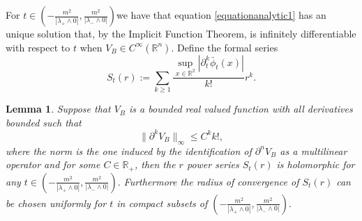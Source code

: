 \documentclass[a4paper,10pt]{article}
\newcommand{\assign}{:=}
\newtheorem{lemma}[theorem]{Lemma}
\begin{document}
For $t \in \left( - \frac{m^2}{| \lambda_+ \wedge 0 |}, \frac{m^2}{|
\lambda_- \wedge 0 |} \right) $we have that equation
{\eqref{equationanalytic1}} has an unique solution that, by the Implicit
Function Theorem, is infinitely differentiable with respect to $t$ when $V_B
\in C^{\infty} (\mathbb{R}^n)$. Define the formal series
\begin{equation}
  S_t (r) \assign \sum_{k \geqslant 1} \frac{\sup_{x \in \mathbb{R}^2}  |
  \partial^k_t \bar{\phi}_t (x) |}{k!} r^k . \label{equationserie1}
\end{equation}


\begin{lemma}
  \label{lemma_serie1}Suppose that $V_B$ is a bounded real valued function with all
  derivatives bounded such that
  \[ \| \partial^k V_B \|_{\infty} \leqslant C^k k!, \]
  where the norm is the one induced by the identification of $\partial^n V_B$
  as a multilinear operator and for some $C \in \mathbb{R}_+$, then the $r$
  power series $S_t (r)$ is holomorphic for any $t \in \left( - \frac{m^2}{|
  \lambda_+ \wedge 0 |}, \frac{m^2}{| \lambda_- \wedge 0 |} \right) .$
  Furthermore the radius of convergence of $S_t (r)$ can be chosen uniformly
  for $t$ in compact subsets of $\left( - \frac{m^2}{| \lambda_+ \wedge 0 |},
  \frac{m^2}{| \lambda_- \wedge 0 |} \right) .$
\end{lemma}
\end{document}
